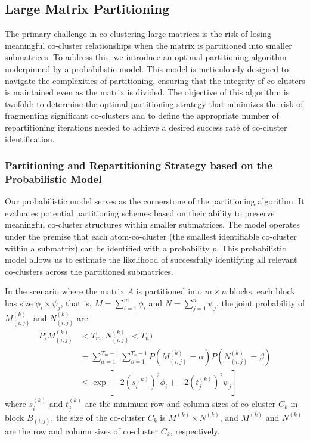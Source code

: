 \subsection{Large Matrix Partitioning}
The primary challenge in co-clustering large matrices is the risk of losing meaningful co-cluster relationships when the matrix is partitioned into smaller submatrices. To address this, we introduce an optimal partitioning algorithm underpinned by a probabilistic model. This model is meticulously designed to navigate the complexities of partitioning, ensuring that the integrity of co-clusters is maintained even as the matrix is divided. The objective of this algorithm is twofold: to determine the optimal partitioning strategy that minimizes the risk of fragmenting significant co-clusters and to define the appropriate number of repartitioning iterations needed to achieve a desired success rate of co-cluster identification.

\subsubsection{Partitioning and Repartitioning Strategy based on the Probabilistic Model}
Our probabilistic model serves as the cornerstone of the partitioning algorithm. It evaluates potential partitioning schemes based on their ability to preserve meaningful co-cluster structures within smaller submatrices. The model operates under the premise that each atom-co-cluster (the smallest identifiable co-cluster within a submatrix) can be identified with a probability $p$. This probabilistic model allows us to estimate the likelihood of successfully identifying all relevant co-clusters across the partitioned submatrices.

In the scenario where the matrix $A$ is partitioned into $m \times n$ blocks, each block has size $\phi_i \times \psi_j$, that is, $M=\sum_{i=1}^m \phi_i$ and $N=\sum_{j=1}^n \psi_j$, the joint probability of $M_{(i,j)}^{(k)}$ and $N_{(i,j)}^{(k)}$ are
\begin{equation}
    \label{eq:joint_probability}
    \begin{split}
        P(M_{(i,j)}^{(k)} & < T_m, N_{(i,j)}^{(k)} < T_n)                                                                           \\
                          & = \sum_{\alpha=1}^{T_m-1} \sum_{\beta=1}^{T_n-1} P(M_{(i,j)}^{(k)} = \alpha) P(N_{(i,j)}^{(k)} = \beta) \\
                          & \le \exp[-2 (s_i^{(k)})^2 \phi_i + -2 (t_j^{(k)})^2 \psi_j]
    \end{split}
\end{equation}
where $s_i^{(k)}$ and $t_j^{(k)}$ are the minimum row and column sizes of co-cluster $C_k$ in block $B_{(i,j)}$, the size of the co-cluster $C_k$ is $M^{(k)} \times N^{(k)}$, and $M^{(k)}$ and $N^{(k)}$ are the row and column sizes of co-cluster $C_k$, respectively.

